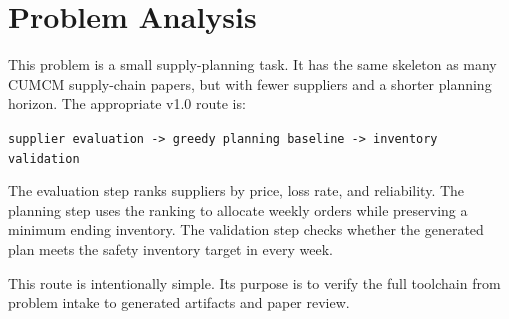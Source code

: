 \section{Problem Analysis}

This problem is a small supply-planning task. It has the same skeleton as many CUMCM supply-chain papers, but with fewer suppliers and a shorter planning horizon. The appropriate v1.0 route is:

\begin{center}
\texttt{supplier evaluation -> greedy planning baseline -> inventory validation}
\end{center}

The evaluation step ranks suppliers by price, loss rate, and reliability. The planning step uses the ranking to allocate weekly orders while preserving a minimum ending inventory. The validation step checks whether the generated plan meets the safety inventory target in every week.

This route is intentionally simple. Its purpose is to verify the full toolchain from problem intake to generated artifacts and paper review.
